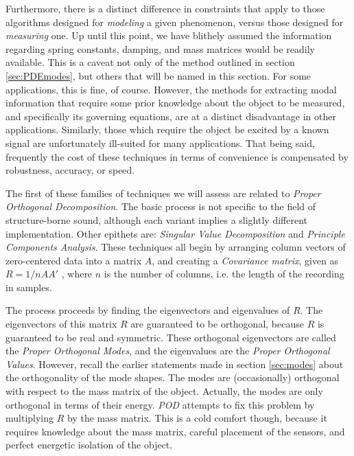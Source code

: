 \documentclass[a4paper,10pt]{report}
\numberwithin{equation}{section}
\begin{document}
Furthermore, there is a distinct difference in constraints that apply to those algorithms designed for \emph{modeling} a given phenomenon, versus those designed for \emph{measuring} one. Up until this point, we have blithely assumed the information regarding spring constants, damping, and mass matrices would be readily available. This is a caveat not only of the method outlined in section \ref{sec:PDEmodes}, but others that will be named in this section. For some applications, this is fine, of course. However, the methods for extracting modal information that require some prior knowledge about the object to be measured, and specifically its governing equations, are at a distinct disadvantage in other applications. Similarly, those which require the object be excited by a known signal are unfortunately ill-suited for many applications. That being said, frequently the cost of these techniques in terms of convenience is compensated by robustness, accuracy, or speed.

The first of these families of techniques we will assess are related to \emph{Proper Orthogonal Decomposition}. \cite{Han2003} \cite{Kerschen2002} \cite{Feeny1998} The basic process is not specific to the field of structure-borne sound, although each variant implies a slightly different implementation. Other epithets are: \emph{Singular Value Decomposition} and \emph{Principle Components Analysis}. These techniques all begin by arranging column vectors of zero-centered data into a matrix $A$, and creating a \emph{Covariance matrix}, given as $R = 1/n A A'$ , where $n$ is the number of columns, i.e. the length of the recording in samples. 

The process proceeds by finding the eigenvectors and eigenvalues of $R$. The eigenvectors of this matrix $R$ are guaranteed to be orthogonal, because $R$ is guaranteed to be real and symmetric. These orthogonal eigenvectors are called the \emph{Proper Orthogonal Modes}, and the eigenvalues are the \emph{Proper Orthogonal Values}. However, recall the earlier statements made in section \ref{sec:modes} about the orthogonality of the mode shapes. The modes are (occasionally) orthogonal with respect to the mass matrix of the object. Actually, the modes are only orthogonal in terms of their energy. \cite{Cremer1973} \emph{POD} attempts to fix this problem by multiplying $R$ by the mass matrix.\cite{Han2003} This is a cold comfort though, because it requires knowledge about the mass matrix, careful placement of the sensors, and perfect energetic isolation of the object. 
\end{document}
